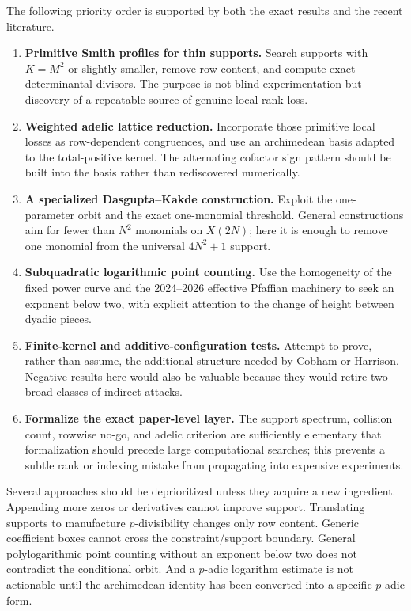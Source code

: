 \documentclass[11pt,oneside]{article}
\theoremstyle{definition}
\theoremstyle{remark}
\begin{document}
The following priority order is supported by both the exact results and the recent literature.

\begin{enumerate}
\item \textbf{Primitive Smith profiles for thin supports.}  Search supports with
$K=M^2$ or slightly smaller, remove row content, and compute exact determinantal divisors.
The purpose is not blind experimentation but discovery of a repeatable source of genuine
local rank loss.

\item \textbf{Weighted adelic lattice reduction.}  Incorporate those primitive local losses
as row-dependent congruences, and use an archimedean basis adapted to the total-positive
kernel.  The alternating cofactor sign pattern should be built into the basis rather than
rediscovered numerically.

\item \textbf{A specialized Dasgupta--Kakde construction.}  Exploit the one-parameter orbit
and the exact one-monomial threshold.  General constructions aim for fewer than $N^2$
monomials on $X(2N)$; here it is enough to remove one monomial from the universal
$4N^2+1$ support.

\item \textbf{Subquadratic logarithmic point counting.}  Use the homogeneity of the fixed
power curve and the 2024--2026 effective Pfaffian machinery to seek an exponent below two,
with explicit attention to the change of height between dyadic pieces.

\item \textbf{Finite-kernel and additive-configuration tests.}  Attempt to prove, rather than
assume, the additional structure needed by Cobham or Harrison.  Negative results here would
also be valuable because they would retire two broad classes of indirect attacks.

\item \textbf{Formalize the exact paper-level layer.}  The support spectrum, collision count,
rowwise no-go, and adelic criterion are sufficiently elementary that formalization should
precede large computational searches; this prevents a subtle rank or indexing mistake from
propagating into expensive experiments.
\end{enumerate}

Several approaches should be deprioritized unless they acquire a new ingredient.  Appending
more zeros or derivatives cannot improve support.  Translating supports to manufacture
$p$-divisibility changes only row content.  Generic coefficient boxes cannot cross the
constraint/support boundary.  General polylogarithmic point counting without an exponent
below two does not contradict the conditional orbit.  And a $p$-adic logarithm estimate is
not actionable until the archimedean identity has been converted into a specific $p$-adic
form.
\end{document}

